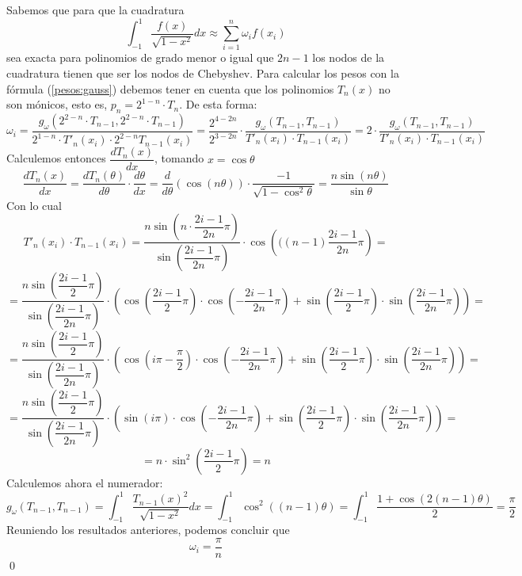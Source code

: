 \begin{dem}
Sabemos que para que la cuadratura
$$\int_{-1}^1\dfrac{f(x)}{\sqrt{1-x^2}}dx\approx\sum_{i=1}^n\omega_if(x_i) $$
sea exacta para polinomios de grado menor o igual que $2n-1$ los nodos de la cuadratura tienen que ser los nodos de Chebyshev. Para calcular los pesos con la fórmula (\ref{pesos:gauss}) debemos tener en cuenta que los polinomios $T_n(x)$ no son mónicos, esto es, $p_n=2^{1-n}\cdot T_n$. De esta forma:
$$\omega_i=\dfrac{g_\omega(2^{2-n}\cdot T_{n-1},2^{2-n}\cdot T_{n-1})}{2^{1-n}\cdot T'_n(x_i)\cdot 2^{2-n}T_{n-1}(x_i)}=\dfrac{2^{4-2n}}{2^{3-2n}}\cdot \dfrac{g_\omega(T_{n-1},T_{n-1})}{T'_n(x_i)\cdot T_{n-1}(x_i)}= 2\cdot  \dfrac{g_\omega(T_{n-1},T_{n-1})}{T'_n(x_i)\cdot T_{n-1}(x_i)}  $$
Calculemos entonces $\dfrac{dT_n(x)}{dx}$, tomando $x=\cos\theta$
$$\dfrac{dT_n(x)}{dx}=\dfrac{dT_n(\theta)}{d\theta}\cdot \dfrac{d\theta}{dx}=\dfrac{d}{d\theta}(\cos(n\theta))\cdot\dfrac{-1}{\sqrt{1-\cos^2\theta}}=\dfrac{n\sin(n\theta)}{\sin\theta}$$
Con lo cual
$$T'_{n}(x_i)\cdot T_{n-1}(x_i)=\dfrac{n\sin\left(n\cdot\dfrac{2i-1}{2n}\pi\right)}{\sin\left(\dfrac{2i-1}{2n}\pi\right)}\cdot \cos\left(((n-1)\dfrac{2i-1}{2n}\pi\right)=$$
$$=\dfrac{n\sin\left(\dfrac{2i-1}{2}\pi\right)}{\sin\left(\dfrac{2i-1}{2n}\pi\right)}\cdot\left(\cos\left(\dfrac{2i-1}{2}\pi\right)\cdot \cos\left(-\dfrac{2i-1}{2n}\pi\right)+\sin\left(\dfrac{2i-1}{2}\pi\right)\cdot \sin\left(\dfrac{2i-1}{2n}\pi\right)\right)=$$
$$=\dfrac{n\sin\left(\dfrac{2i-1}{2}\pi\right)}{\sin\left(\dfrac{2i-1}{2n}\pi\right)}\cdot\left(\cos\left(i\pi-\dfrac{\pi}{2}\right)\cdot \cos\left(-\dfrac{2i-1}{2n}\pi\right)+\sin\left(\dfrac{2i-1}{2}\pi\right)\cdot \sin\left(\dfrac{2i-1}{2n}\pi\right)\right)=$$
$$=\dfrac{n\sin\left(\dfrac{2i-1}{2}\pi\right)}{\sin\left(\dfrac{2i-1}{2n}\pi\right)}\cdot\left(\sin\left(i\pi\right)\cdot \cos\left(-\dfrac{2i-1}{2n}\pi\right)+\sin\left(\dfrac{2i-1}{2}\pi\right)\cdot \sin\left(\dfrac{2i-1}{2n}\pi\right)\right)=$$
$$=n\cdot \sin^2\left(\dfrac{2i-1}{2}\pi\right)=n$$
Calculemos ahora el numerador:
$$g_{\omega}(T_{n-1},T_{n-1})=\int_{-1}^1\dfrac{T_{n-1}(x)^2}{\sqrt{1-x^2}}dx=\int_{-1}^1\cos^2((n-1)\theta)=\int_{-1}^1\dfrac{1+\cos(2(n-1)\theta)}{2}=\dfrac{\pi}{2}$$
Reuniendo los resultados anteriores, podemos concluir que
$$\omega_i=\dfrac{\pi}{n}$$
\qed\end{dem}
